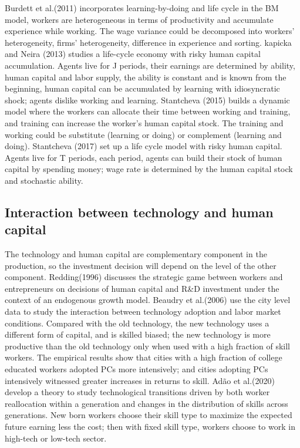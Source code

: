 \documentclass{article}
\newcommand{\1}{\mathbb{1}}
\begin{document}
Burdett et al.(2011)\cite{Burdettetal2011} incorporates learning-by-doing and life cycle in the BM model, workers are heterogeneous in terms of productivity and accumulate experience while working. The wage variance could be decomposed into workers' heterogeneity, firms' heterogeneity, difference in experience and sorting. 
kapicka and Neira (2013) studies a life-cycle economy with risky human capital accumulation. Agents live for J periods, their earnings are determined by ability, human capital and labor supply, the ability is constant and is known from the beginning, human capital can be accumulated by learning with idiosyncratic shock; agents dislike working and learning. 
Stantcheva (2015)\cite{Stantcheva2015} builds a dynamic model where the workers can allocate their time between working and training, and training can increase the worker's human capital stock. The training and working could be substitute (learning or doing) or complement (learning and doing). 
Stantcheva (2017)\cite{Stantcheva2017} set up a life cycle model with risky human capital. Agents live for T periods, each period, agents can build their stock of human capital by spending money; wage rate is determined by the human capital stock and stochastic ability. \\

\subsection{Interaction between technology and human capital}
The technology and human capital are complementary component in the production, so the investment decision will depend on the level of the other component. 
Redding(1996)\cite{Redding1996} discusses the strategic game between workers and entrepreneurs on decisions of human capital and R\&D investment under the context of an endogenous growth model. 
Beaudry et al.(2006)\cite{Beaudryetal2006} use the city level data to study the interaction between technology adoption and labor market conditions. Compared with the old technology, the new technology uses a different form of capital, and is skilled biased; the new technology is more productive than the old technology only when used with a high fraction of skill workers. The empirical results show that cities with a high fraction of college educated workers adopted PCs more intensively; and cities adopting PCs intensively witnessed greater increases in returns to skill. 
Ad{\~a}o et al.(2020)\cite{Adaoetal2020} develop a theory to study technological transitions driven by both worker
reallocation within a generation and changes in the distribution of skills across generations. New born workers choose their skill type to maximize the expected future earning less the cost; then with fixed skill type, workers choose to work in high-tech or low-tech sector.  \\
\end{document}
